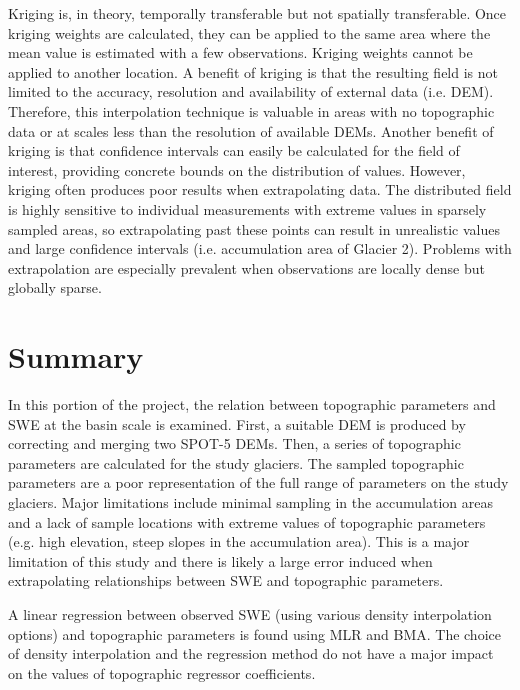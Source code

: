 \documentclass{sfuthesis}
\begin{document}
Kriging is, in theory, temporally transferable but not spatially transferable. Once kriging weights are calculated, they can be applied to the same area where the mean value is estimated with a few observations. Kriging weights cannot be applied to another location. A benefit of kriging is that the resulting field is not limited to the accuracy, resolution and availability of external data (i.e. DEM). Therefore, this interpolation technique is valuable in areas with no topographic data or at scales less than the resolution of available DEMs. Another benefit of kriging is that confidence intervals can easily be calculated for the field of interest, providing concrete bounds on the distribution of values. However, kriging often produces poor results when extrapolating data. The distributed field is highly sensitive to individual measurements with extreme values in sparsely sampled areas, so extrapolating past these points can result in unrealistic values and large confidence intervals (i.e. accumulation area of Glacier 2). Problems with extrapolation are especially prevalent when observations are locally dense but globally sparse.




\section{Summary}

In this portion of the project, the relation between topographic parameters and SWE at the basin scale is examined. First, a suitable DEM is produced by correcting and merging two SPOT-5 DEMs. Then, a series of topographic parameters are calculated for the study glaciers. The sampled topographic parameters are a poor representation of the full range of parameters on the study glaciers. Major limitations include minimal sampling in the accumulation areas and a lack of sample locations with extreme values of topographic parameters (e.g. high elevation, steep slopes in the accumulation area). This is a major limitation of this study and there is likely a large error induced when extrapolating  relationships between SWE and topographic parameters. 

A linear regression between observed SWE (using various density interpolation options) and topographic parameters is found using MLR and BMA. The choice of density interpolation and the regression method do not have a major impact on the values of topographic regressor coefficients. 
\end{document}
